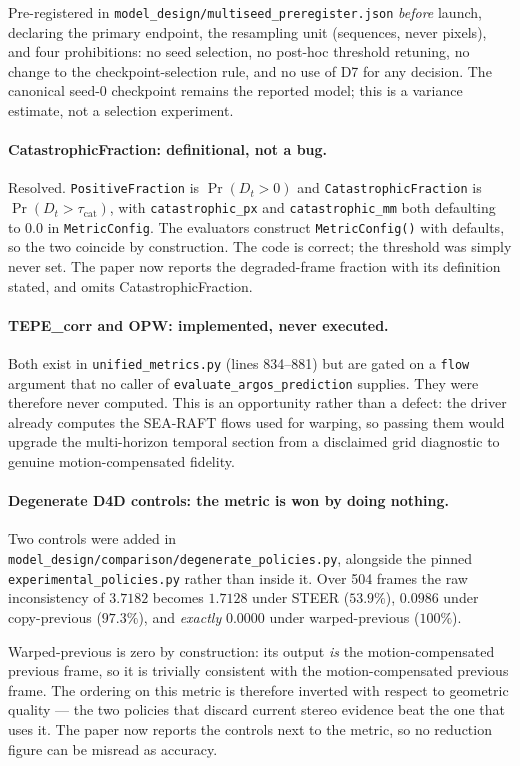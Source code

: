 \documentclass[11pt,a4paper]{article}
\begin{document}
Pre-registered in \texttt{model\_design/multiseed\_preregister.json}
\emph{before} launch, declaring the primary endpoint, the resampling
unit (sequences, never pixels), and four prohibitions: no seed
selection, no post-hoc threshold retuning, no change to the
checkpoint-selection rule, and no use of D7 for any decision. The
canonical seed-0 checkpoint remains the reported model; this is a
variance estimate, not a selection experiment.

\paragraph{CatastrophicFraction: definitional, not a bug.}
Resolved. \texttt{PositiveFraction} is $\Pr(D_t>0)$ and
\texttt{CatastrophicFraction} is $\Pr(D_t>\tau_{\mathrm{cat}})$, with
\texttt{catastrophic\_px} and \texttt{catastrophic\_mm} both defaulting
to $0.0$ in \texttt{MetricConfig}. The evaluators construct
\texttt{MetricConfig()} with defaults, so the two coincide by
construction. The code is correct; the threshold was simply never set.
The paper now reports the degraded-frame fraction with its definition
stated, and omits CatastrophicFraction.

\paragraph{TEPE\_corr and OPW: implemented, never executed.}
Both exist in \texttt{unified\_metrics.py} (lines 834--881) but are
gated on a \texttt{flow} argument that no caller of
\texttt{evaluate\_argos\_prediction} supplies. They were therefore never
computed. This is an opportunity rather than a defect: the driver
already computes the SEA-RAFT flows used for warping, so passing them
would upgrade the multi-horizon temporal section from a disclaimed
grid diagnostic to genuine motion-compensated fidelity.

\paragraph{Degenerate D4D controls: the metric is won by doing nothing.}
Two controls were added in
\texttt{model\_design/comparison/degenerate\_policies.py}, alongside the
pinned \texttt{experimental\_policies.py} rather than inside it.
Over 504 frames the raw inconsistency of $3.7182$ becomes $1.7128$ under
STEER ($53.9\%$), $0.0986$ under copy-previous ($97.3\%$), and
\emph{exactly} $0.0000$ under warped-previous ($100\%$).

Warped-previous is zero by construction: its output \emph{is} the
motion-compensated previous frame, so it is trivially consistent with
the motion-compensated previous frame. The ordering on this metric is
therefore inverted with respect to geometric quality --- the two
policies that discard current stereo evidence beat the one that uses it.
The paper now reports the controls next to the metric, so no reduction
figure can be misread as accuracy.
\end{document}
